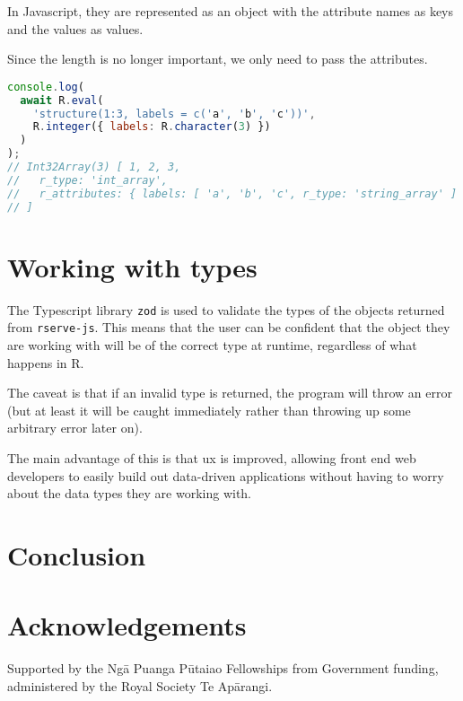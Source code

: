 \documentclass{article}
\newcommand{\pkg}[1]{\texttt{#1}}
\newcommand{\prog}[1]{{\sf #1}}
\newcommand{\R}{\prog{R}}
\begin{document}
In Javascript, they are represented as an object with the attribute names as keys and the values as values.

Since the length is no longer important, we only need to pass the attributes.

\begin{lstlisting}[language=Javascript, numbers=none]
console.log(
  await R.eval(
    'structure(1:3, labels = c('a', 'b', 'c'))',
    R.integer({ labels: R.character(3) })
  )
);
// Int32Array(3) [ 1, 2, 3,
//   r_type: 'int_array',
//   r_attributes: { labels: [ 'a', 'b', 'c', r_type: 'string_array' ] }
// ]
\end{lstlisting}

\section{Working with types}
\label{sec:working-with-types}

The Typescript library \pkg{zod} is used to validate the types of the objects returned from \pkg{rserve-js}.
This means that the user can be confident that the object they are working with will be of the correct type at runtime, regardless of what happens in \R{}.

The caveat is that if an invalid type is returned, the program will throw an error (but at least it will be caught immediately rather than throwing up some arbitrary error later on).

The main advantage of this is that \gls{ux} is improved, allowing front end web developers to easily build out data-driven applications without having to worry about the data types they are working with.

\section{Conclusion}
\label{sec:conclusion}

\section*{Acknowledgements}

Supported by the Ngā Puanga Pūtaiao Fellowships from Government funding, administered by the Royal Society Te Apārangi.

\printglossaries
\printbibliography
\end{document}
